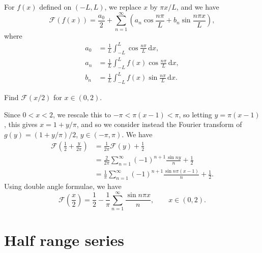 \documentclass[letter-paper]{tufte-book}
\newenvironment{example}[1][Example]{\begin{trivlist}
\item[\hskip \labelsep {\bfseries #1}]}{\end{trivlist}}
\begin{document}
For $f(x)$ defined on $(-L,L)$, we replace $x$ by $\pi x/L$, and we have
\begin{equation*}
  \mathcal{F}(f(x)) = \frac{a_0}{2} 
  + \sum_{n=1}^\infty \left(a_n\cos\frac{n\pi }{L} 
  + b_n\sin\frac{n\pi x}{L}\right),
\end{equation*}
where
\begin{align*}
  a_0 &= \frac{1}{L}\int_{-L}^L \cos\frac{n\pi }{L}\, \mathrm{d}x, \\
  a_n &= \frac{1}{L}\int_{-L}^L f(x)\cos\frac{n\pi }{L}\, \mathrm{d}x, \\
  b_n &= \frac{1}{L}\int_{-L}^L f(x)\sin\frac{n\pi }{L}\, \mathrm{d}x.
\end{align*}
\begin{example}
  Find $\mathcal{F}(x/2)$ for $x\in(0,2)$.
  
  Since $0<x<2$, we rescale this to $-\pi<\pi(x-1)<\pi$, so letting
  $y=\pi(x-1)$, this gives $x=1+y/\pi$, and so we consider instead the Fourier
  transform of $g(y) = (1+y/\pi)/2$, $y\in(-\pi,\pi)$. We have
  \begin{align*}
    \mathcal{F}\left(\frac{1}{2}+\frac{y}{2\pi}\right) &= \frac{1}{2\pi}\mathcal{F}(y) + \frac{1}{2} \\
      &= \frac{2}{2\pi}\sum_{n=1}^\infty (-1)^{n+1}\frac{\sin ny}{n} + \frac{1}{2} \\
      &= \frac{1}{\pi}\sum_{n=1}^\infty (-1)^{n+1} \frac{\sin n\pi(x-1)}{n} + 
    \frac{1}{2}.
  \end{align*}
  Using double angle formulae, we have
  \begin{equation*}
    \mathcal{F}\left(\frac{x}{2}\right) = \frac{1}{2} 
    - \frac{1}{\pi}\sum_{n=1}^\infty \frac{\sin n\pi x}{n},\qquad x\in(0,2).
  \end{equation*}
\end{example}


\section{Half range series}
\end{document}
